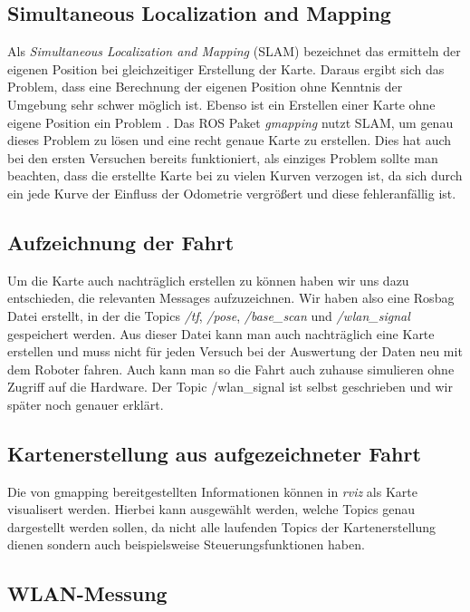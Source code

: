 \documentclass{scrartcl}%
\begin{document}
\subsection{Simultaneous Localization and Mapping}
Als \textit{Simultaneous Localization and Mapping} (SLAM) bezeichnet das ermitteln der eigenen Position bei gleichzeitiger Erstellung der Karte. Daraus ergibt sich das Problem, dass eine Berechnung der eigenen Position ohne Kenntnis der Umgebung sehr schwer möglich ist. Ebenso ist ein Erstellen einer Karte ohne eigene Position ein Problem \cite{slam}. Das ROS Paket \textit{gmapping} nutzt SLAM, um genau dieses Problem zu lösen und eine recht genaue Karte zu erstellen. Dies hat auch bei den ersten Versuchen bereits funktioniert, als einziges Problem sollte man beachten, dass die erstellte Karte bei zu vielen Kurven verzogen ist, da sich durch ein jede Kurve der Einfluss der Odometrie vergrößert und diese fehleranfällig ist.

\subsection{Aufzeichnung der Fahrt}
Um die Karte auch nachträglich erstellen zu können haben wir uns dazu entschieden, die relevanten Messages aufzuzeichnen. Wir haben also eine Rosbag Datei erstellt, in der die Topics \textit{/tf}, \textit{/pose}, \textit{/base\_scan} und \textit{/wlan\_signal} gespeichert werden. Aus dieser Datei kann man auch nachträglich eine Karte erstellen und muss nicht für jeden Versuch bei der Auswertung der Daten neu mit dem Roboter fahren. Auch kann man so die Fahrt auch zuhause simulieren ohne Zugriff auf die Hardware. Der Topic /wlan\_signal ist selbst geschrieben und wir später noch genauer erklärt.

\subsection{Kartenerstellung aus aufgezeichneter Fahrt}
Die von gmapping bereitgestellten Informationen können in \textit{rviz} als Karte visualisert werden. Hierbei kann ausgewählt werden, welche Topics genau dargestellt werden sollen, da nicht alle laufenden Topics der Kartenerstellung dienen sondern auch beispielsweise Steuerungsfunktionen haben.

\subsection{WLAN-Messung}
\end{document}
